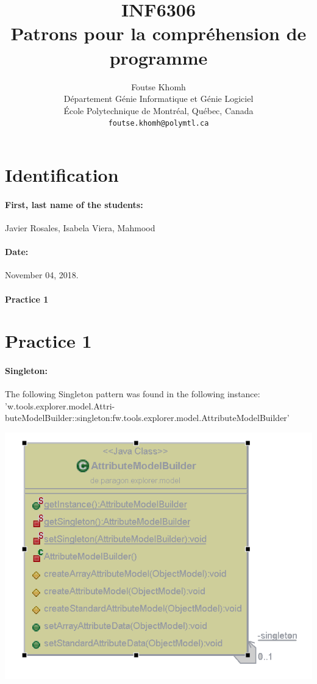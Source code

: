 \documentclass[11pt]{article}
\title{INF6306\\Patrons pour la compr\'{e}hension de programme}
\author{
    Foutse Khomh \\
    D\'{e}partement G\'{e}nie Informatique et G\'{e}nie Logiciel \\
    \'{E}cole Polytechnique de Montr\'{e}al, Qu\'{e}bec, Canada \\
    \texttt{foutse.khomh@polymtl.ca}
}
\date{}
\def\titre{}
\def\auteur{}
\begin{document}
\maketitle

\section{Identification}

\paragraph{First, last name of the students:} Javier Rosales, Isabela Viera, Mahmood \auteur 
\paragraph{Date:} November 04, 2018.

\paragraph{Practice 1}\titre


\section{Practice 1}


\paragraph{Singleton:\\}

The following Singleton pattern was found in the following instance: 'w.tools.explorer.model.Attri-
buteModelBuilder::singleton:fw.tools.explorer.model.AttributeModelBuilder'

\begin{center}
\includegraphics{Singleton}
\end{center}
\end{document}
